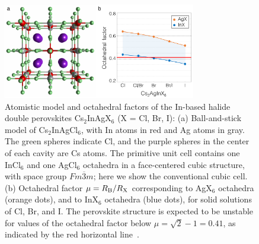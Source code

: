 \documentclass[journal=jpcl,manuscript=letter,layout=traditional]{achemso}
\begin{document}
\vspace{0.6cm}



\newpage

\begin{figure}[ht!]
\begin{center}
\includegraphics[width=0.75\textwidth]{figure1.png}
\end{center}
\caption{\label{fig:1}
   Atomistic model and octahedral factors of the In-based halide double perovskites Cs$_2$InAgX$_6$
   (X = Cl, Br, I): (a) Ball-and-stick model of Cs$_2$InAgCl$_6$, with In atoms in red and Ag atoms
   in gray. The green spheres indicate Cl, and the purple spheres in the center of each cavity are Cs atoms.
   The primitive unit cell contains one InCl$_6$ and one AgCl$_6$ octahedra in a face-centered cubic
   structure, with space group $Fm\overline{3}m$; here we show the conventional cubic cell.
   (b) Octahedral factor $\mu = R_{\rm B}/R_{\rm X}$ corresponding to AgX$_6$ octahedra (orange dots),
   and to InX$_6$ octahedra (blue dots), for solid solutions of Cl, Br, and I. The perovskite structure
   is expected to be unstable for values of the octahedral factor below $\mu = \sqrt{2}-1 = 0.41$,
   as indicated by the red horizontal line~\cite{li}.
   }
\end{figure}

\newpage
\end{document}
